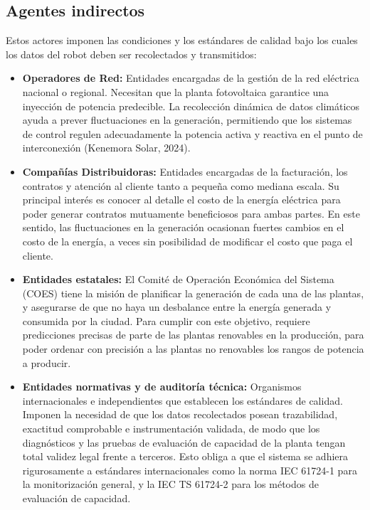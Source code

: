 \documentclass[../../General.tex]{subfiles}
\begin{document}
\subsection{Agentes indirectos}
Estos actores imponen las condiciones y los estándares de calidad bajo los cuales los datos del robot deben ser recolectados y transmitidos:

\begin{itemize}

    \item \textbf{Operadores de Red:} Entidades encargadas de la gestión de la red eléctrica nacional o regional. Necesitan que la planta fotovoltaica garantice una inyección de potencia predecible. La recolección dinámica de datos climáticos ayuda a prever fluctuaciones en la generación, permitiendo que los sistemas de control regulen adecuadamente la potencia activa y reactiva en el punto de interconexión (Kenemora Solar, 2024).
    
    \item \textbf{Compañías Distribuidoras:} Entidades encargadas de la facturación, los contratos y atención al cliente tanto a pequeña como mediana escala. Su principal interés es conocer al detalle el costo de la energía eléctrica para poder generar contratos mutuamente beneficiosos para ambas partes. En este sentido, las fluctuaciones en la generación ocasionan fuertes cambios en el costo de la energía, a veces sin posibilidad de modificar el costo que paga el cliente.
    
    \item \textbf{Entidades estatales:} El Comité de Operación Económica del Sistema (COES) tiene la misión de planificar la generación de cada una de las plantas, y asegurarse de que no haya un desbalance entre la energía generada y consumida por la ciudad. Para cumplir con este objetivo, requiere predicciones precisas de parte de las plantas renovables en la producción, para poder ordenar con precisión a las plantas no renovables los rangos de potencia a producir.
    
    \item \textbf{Entidades normativas y de auditoría técnica:} Organismos internacionales e independientes que establecen los estándares de calidad. Imponen la necesidad de que los datos recolectados posean trazabilidad, exactitud comprobable e instrumentación validada, de modo que los diagnósticos y las pruebas de evaluación de capacidad de la planta tengan total validez legal frente a terceros. Esto obliga a que el sistema se adhiera rigurosamente a estándares internacionales como la norma IEC 61724-1 para la monitorización general, y la IEC TS 61724-2 para los métodos de evaluación de capacidad.

\end{itemize}
\end{document}
